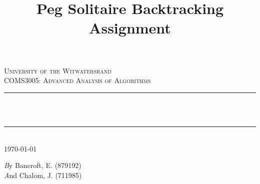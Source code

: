 \documentclass[a4paper]{article}
\title{Peg Solitaire Backtracking Assignment}
\begin{document}
\begin{titlepage}

\newcommand{\HRule}{\rule{\linewidth}{0.5mm}} %

\center %
 

\textsc{\LARGE University of the Witwatersrand}\\[1.5cm] %
\textsc{\Large COMS3005: Advanced Analysis of Algorithms}\\[0.5cm] %

\makeatletter
\HRule \\[0.4cm]
{ \huge \bfseries \@title}\\[0.4cm] %
\HRule \\[1.5cm]
 
{\large \today}\\[2cm] %

\begin{minipage}{1\textwidth}
  \Large \emph By Bancroft, E. (879192)\\
  \Large \emph And Chalom, J. (711985)\\
\end{minipage}






\end{titlepage}
\end{document}
